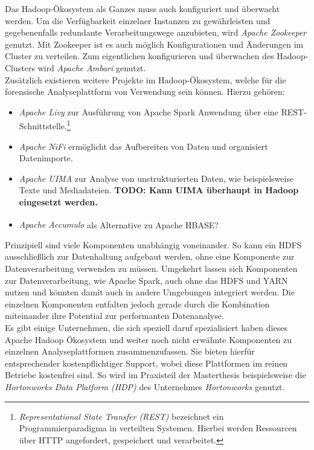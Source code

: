\noindent
Das Hadoop-Ökosystem als Ganzes muss auch konfiguriert und überwacht werden. Um die Verfügbarkeit einzelner Instanzen zu gewährleisten und gegebenenfalls redundante Verarbeitungswege anzubieten, wird \textit{Apache Zookeeper\texttrademark\thinspace} genutzt. Mit Zookeeper ist es auch möglich Konfigurationen und Änderungen im Cluster zu verteilen. Zum eigentlichen konfigurieren und überwachen des Hadoop-Clusters wird \textit{Apache Ambari\texttrademark\thinspace} genutzt.\\

\noindent
Zusätzlich existieren weitere Projekte im Hadoop-Ökosystem, welche für die forensische Analyseplattform von Verwendung sein können.
Hierzu gehören:
\begin{itemize}
\item \textit{Apache Livy} zur Ausführung von Apache Spark Anwendung über eine REST-Schnittstelle.\footnote{\textit{Representational State Transfer (REST)} bezeichnet ein Programmierparadigma in verteilten Systemen. Hierbei werden Ressourcen über HTTP angefordert, gespeichert und verarbeitet.}
\item \textit{Apache NiFi} ermöglicht das Aufbereiten von Daten und organisiert Datenimporte.
\item \textit{Apache UIMA\texttrademark\thinspace} zur Analyse von unstrukturierten Daten, wie beispielsweise Texte und Mediadateien. \textbf{TODO: Kann UIMA überhaupt in Hadoop eingesetzt werden.}
\item \textit{Apache Accumulo\textsuperscript{\textregistered}} als Alternative zu Apache HBASE?
\end{itemize} 

\noindent
Prinzipiell sind viele Komponenten unabhängig voneinander. So kann ein HDFS ausschließlich zur Datenhaltung aufgebaut werden, ohne eine Komponente zur Datenverarbeitung verwenden zu müssen. Umgekehrt lassen sich Komponenten zur Datenverarbeitung, wie Apache Spark, auch ohne das HDFS und YARN nutzen und könnten damit auch in andere Umgebungen integriert werden. Die einzelnen Komponenten entfalten jedoch gerade durch die Kombination miteinander ihre Potential zur performanten Datenanalyse.\\

\noindent
Es gibt einige Unternehmen, die sich speziell daruf spezialisiert haben dieses Apache Hadoop Ökosystem und weiter noch nicht erwähnte Komponenten zu einzelnen Analyseplattformen zusammenzufassen. Sie bieten hierfür entsprechender kostenpflichtiger Support, wobei diese Plattformen im reinen Betriebe kostenfrei sind. So wird im Praxisteil der Masterthesis beispielsweise die \textit{Hortonworks Data Platform (HDP)} des Unternehmes \textit{Hortonworks} genutzt.


